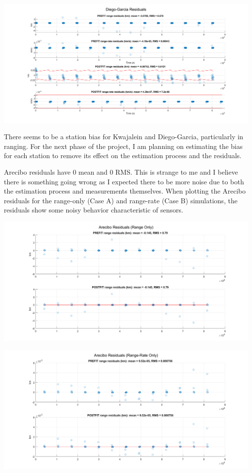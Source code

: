 \documentclass[conf]{new-aiaa}
\begin{document}
\includegraphics[width=\textwidth]{DGO_res_all_zoom.png}

There seems to be a station bias for Kwajalein and Diego-Garcia, particularly in ranging. For the next phase of the project, I am planning on estimating the bias for each station to remove its effect on the estimation process and the residuals. 

Arecibo residuals have 0 mean and 0 RMS. This is strange to me and I believe there is something going wrong as I expected there to be more noise due to both the estimation process and measurements themselves. When plotting the Arecibo residuals for the range-only (Case A) and range-rate (Case B) simulations, the residuals show some noisy behavior characteristic of sensors. 

\includegraphics[width=\textwidth]{ACB_res_r.png}

\includegraphics[width=\textwidth]{ACB_res_rr.png}
\end{document}
